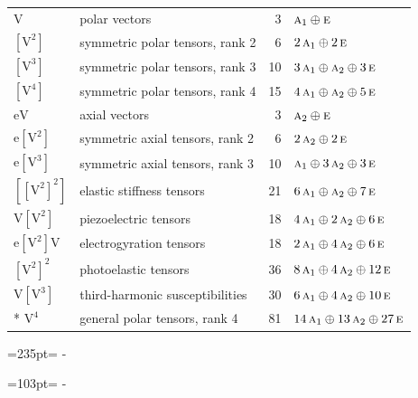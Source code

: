 \documentclass[10pt,a4paper]{article}
\newcommand{\needspace}[1]{\par\penalty-100\begingroup\dimen0=#1\relax\dimen2=\pagegoal
  \advance\dimen2-\pagetotal\ifdim\dimen0>\dimen2\relax\ifdim\dimen2>0pt\vfil\break\fi\fi
  \endgroup}
\numberwithin{equation}{section}
\newcommand{\irr}[1]{\text{\normalfont\scshape #1}}
\newcommand{\jahn}[1]{\mathrm{#1}}
\newlength{\fillwidth}\newlength{\cellwidth}\newlength{\colwidth}
\begin{document}
{\begin{longtable}{@{}llr>{\RaggedRight\arraybackslash}p{\fillwidth}@{}}
$\jahn{V}$ & polar vectors & 3 & $\irr{a}_{1} \oplus\allowbreak \irr{e}$\\
$\jahn{[V^{2}]}$ & symmetric polar tensors, rank 2 & 6 & $2\,\irr{a}_{1} \oplus\allowbreak 2\,\irr{e}$\\
$\jahn{[V^{3}]}$ & symmetric polar tensors, rank 3 & 10 & $3\,\irr{a}_{1} \oplus\allowbreak \irr{a}_{2} \oplus\allowbreak 3\,\irr{e}$\\
$\jahn{[V^{4}]}$ & symmetric polar tensors, rank 4 & 15 & $4\,\irr{a}_{1} \oplus\allowbreak \irr{a}_{2} \oplus\allowbreak 5\,\irr{e}$\\
$\jahn{eV}$ & axial vectors & 3 & $\irr{a}_{2} \oplus\allowbreak \irr{e}$\\
$\jahn{e[V^{2}]}$ & symmetric axial tensors, rank 2 & 6 & $2\,\irr{a}_{2} \oplus\allowbreak 2\,\irr{e}$\\
$\jahn{e[V^{3}]}$ & symmetric axial tensors, rank 3 & 10 & $\irr{a}_{1} \oplus\allowbreak 3\,\irr{a}_{2} \oplus\allowbreak 3\,\irr{e}$\\
$\jahn{[[V^{2}]^{2}]}$ & elastic stiffness tensors & 21 & $6\,\irr{a}_{1} \oplus\allowbreak \irr{a}_{2} \oplus\allowbreak 7\,\irr{e}$\\
$\jahn{V[V^{2}]}$ & piezoelectric tensors & 18 & $4\,\irr{a}_{1} \oplus\allowbreak 2\,\irr{a}_{2} \oplus\allowbreak 6\,\irr{e}$\\
$\jahn{e[V^{2}]V}$ & electrogyration tensors & 18 & $2\,\irr{a}_{1} \oplus\allowbreak 4\,\irr{a}_{2} \oplus\allowbreak 6\,\irr{e}$\\
$\jahn{[V^{2}]^{2}}$ & photoelastic tensors & 36 & $8\,\irr{a}_{1} \oplus\allowbreak 4\,\irr{a}_{2} \oplus\allowbreak 12\,\irr{e}$\\
$\jahn{V[V^{3}]}$ & third-harmonic susceptibilities & 30 & $6\,\irr{a}_{1} \oplus\allowbreak 4\,\irr{a}_{2} \oplus\allowbreak 10\,\irr{e}$\\*
$\jahn{V^{4}}$ & general polar tensors, rank 4 & 81 & $14\,\irr{a}_{1} \oplus\allowbreak 13\,\irr{a}_{2} \oplus\allowbreak 27\,\irr{e}$\\
\bottomrule\end{longtable}}
\needspace{235pt}
\needspace{103pt}
\end{document}
